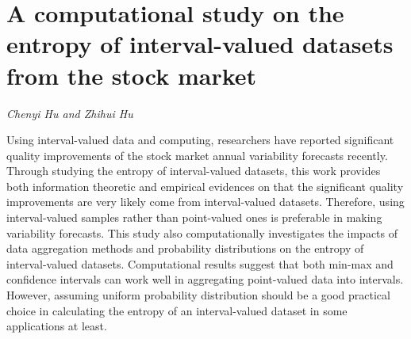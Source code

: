 \documentclass[../booklet.tex]{subfiles}
\begin{document}
\section[A computational study on the entropy of interval-valued datasets from the stock market. {\it Chenyi Hu and Zhihui Hu}]{A computational study on the entropy of interval-valued datasets from the stock market}
 

\begin{center}
  {\it Chenyi Hu and Zhihui Hu}
\end{center}

\vskip 0.8cm


Using interval-valued data and computing, researchers have reported significant quality improvements of the stock market annual variability forecasts recently. Through studying the entropy of interval-valued datasets, this work provides both information theoretic and empirical evidences on that the significant quality improvements are very likely come from interval-valued datasets.  
Therefore, using interval-valued samples rather than point-valued ones is preferable in making variability forecasts. 
This study also computationally investigates the impacts of data aggregation methods and probability distributions on the entropy of interval-valued datasets. Computational results suggest that both min-max and confidence intervals can work well in aggregating point-valued data into intervals. However, assuming uniform probability distribution should be a good practical choice in calculating the entropy of an interval-valued dataset in some applications at least. %
\end{document}
